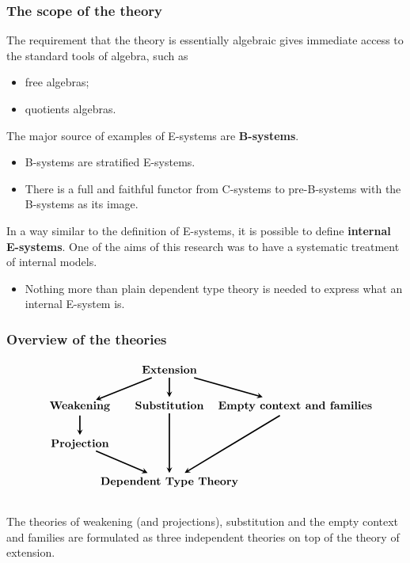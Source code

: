 \documentclass[handout]{beamer}
\newcommand\important[1]{\textbf{\color{red!90!black}#1}}
\begin{document}
\begin{frame}
\frametitle{\bf The scope of the theory}
The requirement that the theory is essentially algebraic gives immediate access to the standard tools of algebra, such as
\begin{itemize}
\item free algebras;
\item quotients algebras.
\end{itemize}
\pause
The major source of examples of E-systems are \important{B-systems}.
\begin{itemize}
\item B-systems are stratified E-systems.
\item There is a full and faithful functor from C-systems to pre-B-systems with the B-systems as its image.
\end{itemize}
\pause
In a way similar to the definition of E-systems, it is possible to define
\important{internal E-systems}. One of the aims of this research was to have
a systematic treatment of internal models.
\begin{itemize}
\item Nothing more than plain dependent type theory is needed to express what
an internal E-system is.
\end{itemize}
\end{frame}

\begin{frame}
\frametitle{\bf Overview of the theories}
\begin{equation*}
\begin{tikzcd}[ampersand replacement=\&,column sep=0em]
{} \& \textbf{Extension} \ar[very thick,-stealth]{dr} \ar[very thick,-stealth]{d} \ar[very thick,-stealth]{dl}
  \\
\makebox[.7cm]{\textbf{Weakening}} \ar[very thick,-stealth]{d} \& \textbf{Substitution} \ar[very thick,-stealth]{dd} \& \makebox[3cm]{\textbf{Empty context and families}} \ar[very thick,-stealth]{ddl}
\\
\makebox[.7cm]{\textbf{Projection}} \ar[very thick,-stealth]{dr}
\\
{} \& \textbf{Dependent Type Theory}
\end{tikzcd}
\end{equation*}
\\[2em]
\pause
The theories of weakening (and projections), substitution and the empty context and families are formulated as three independent theories on top of the theory of extension.
\end{frame}
\end{document}
